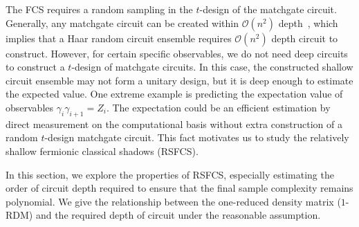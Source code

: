 \documentclass{article}
\begin{document}






The FCS requires a random sampling in the $t$-design of the matchgate circuit. Generally, any matchgate circuit can be created within $\mathcal{O}(n^2)$ depth~\cite{jiang2018quantum}, which implies that a Haar random circuit ensemble requires $\mathcal{O}(n^2)$ depth circuit to construct. 
However, for certain specific observables, we do not need deep circuits to construct a $t$-design of matchgate circuits. In this case, the constructed shallow circuit ensemble may not form a unitary design, but it is deep enough to estimate the expected value. One extreme example is predicting the expectation value of observables $ \gamma_i\gamma_{i+1} = Z_i$. The expectation could be an efficient estimation by direct measurement on the computational basis without extra construction of a random $t$-design matchgate circuit. This fact motivates us to study the relatively shallow fermionic classical shadows (RSFCS).


In this section, we explore the properties of RSFCS, especially estimating the order of circuit depth required to ensure that the final sample complexity remains polynomial. We give the relationship between the one-reduced density matrix ($1$-RDM) and the required depth of circuit under the reasonable assumption. 


\end{document}
